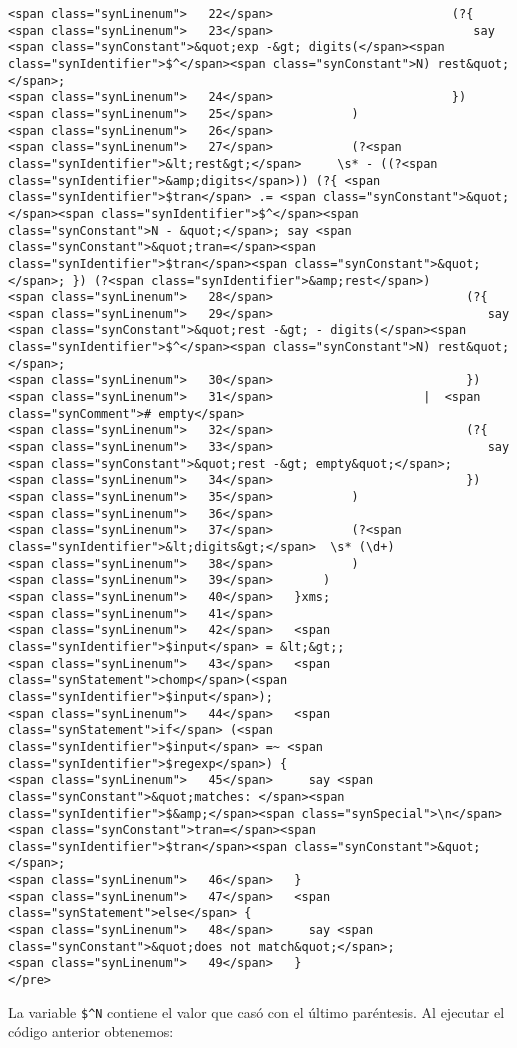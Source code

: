 \begin{verbatim}
<span class="synLinenum">   22</span>                         (?{
<span class="synLinenum">   23</span>                            say <span class="synConstant">&quot;exp -&gt; digits(</span><span class="synIdentifier">$^</span><span class="synConstant">N) rest&quot;</span>;
<span class="synLinenum">   24</span>                         })
<span class="synLinenum">   25</span>           )
<span class="synLinenum">   26</span> 
<span class="synLinenum">   27</span>           (?<span class="synIdentifier">&lt;rest&gt;</span>     \s* - ((?<span class="synIdentifier">&amp;digits</span>)) (?{ <span class="synIdentifier">$tran</span> .= <span class="synConstant">&quot;</span><span class="synIdentifier">$^</span><span class="synConstant">N - &quot;</span>; say <span class="synConstant">&quot;tran=</span><span class="synIdentifier">$tran</span><span class="synConstant">&quot;</span>; }) (?<span class="synIdentifier">&amp;rest</span>)
<span class="synLinenum">   28</span>                           (?{
<span class="synLinenum">   29</span>                              say <span class="synConstant">&quot;rest -&gt; - digits(</span><span class="synIdentifier">$^</span><span class="synConstant">N) rest&quot;</span>;
<span class="synLinenum">   30</span>                           })
<span class="synLinenum">   31</span>                     |  <span class="synComment"># empty</span>
<span class="synLinenum">   32</span>                           (?{
<span class="synLinenum">   33</span>                              say <span class="synConstant">&quot;rest -&gt; empty&quot;</span>;
<span class="synLinenum">   34</span>                           })
<span class="synLinenum">   35</span>           )
<span class="synLinenum">   36</span> 
<span class="synLinenum">   37</span>           (?<span class="synIdentifier">&lt;digits&gt;</span>  \s* (\d+)
<span class="synLinenum">   38</span>           )
<span class="synLinenum">   39</span>       )
<span class="synLinenum">   40</span>   }xms;
<span class="synLinenum">   41</span> 
<span class="synLinenum">   42</span>   <span class="synIdentifier">$input</span> = &lt;&gt;;
<span class="synLinenum">   43</span>   <span class="synStatement">chomp</span>(<span class="synIdentifier">$input</span>);
<span class="synLinenum">   44</span>   <span class="synStatement">if</span> (<span class="synIdentifier">$input</span> =~ <span class="synIdentifier">$regexp</span>) {
<span class="synLinenum">   45</span>     say <span class="synConstant">&quot;matches: </span><span class="synIdentifier">$&amp;</span><span class="synSpecial">\n</span><span class="synConstant">tran=</span><span class="synIdentifier">$tran</span><span class="synConstant">&quot;</span>;
<span class="synLinenum">   46</span>   }
<span class="synLinenum">   47</span>   <span class="synStatement">else</span> {
<span class="synLinenum">   48</span>     say <span class="synConstant">&quot;does not match&quot;</span>;
<span class="synLinenum">   49</span>   }
</pre>

\end{verbatim}
La variable \verb|$^N| contiene el valor que casó con el último paréntesis.
Al ejecutar el código anterior obtenemos:

